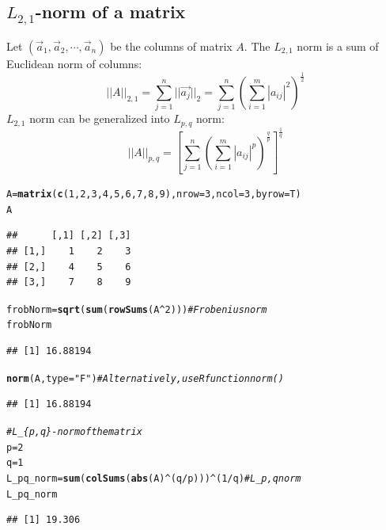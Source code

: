 \documentclass[conference,final,11pt,technote,onecolumn]{IEEEtran}\usepackage[]{graphicx}\usepackage[]{color}
\makeatletter
\newcommand{\hlnum}[1]{\textcolor[rgb]{0.686,0.059,0.569}{#1}}%
\newcommand{\hlstr}[1]{\textcolor[rgb]{0.192,0.494,0.8}{#1}}%
\newcommand{\hlcom}[1]{\textcolor[rgb]{0.678,0.584,0.686}{\textit{#1}}}%
\newcommand{\hlopt}[1]{\textcolor[rgb]{0,0,0}{#1}}%
\newcommand{\hlstd}[1]{\textcolor[rgb]{0.345,0.345,0.345}{#1}}%
\newcommand{\hlkwb}[1]{\textcolor[rgb]{0.69,0.353,0.396}{#1}}%
\newcommand{\hlkwc}[1]{\textcolor[rgb]{0.333,0.667,0.333}{#1}}%
\newcommand{\hlkwd}[1]{\textcolor[rgb]{0.737,0.353,0.396}{\textbf{#1}}}%
\newenvironment{kframe}{%
 \def\at@end@of@kframe{}%
 \ifinner\ifhmode%
  \def\at@end@of@kframe{\end{minipage}}%
  \begin{minipage}{\columnwidth}%
 \fi\fi%
 \def\FrameCommand##1{\hskip\@totalleftmargin \hskip-\fboxsep
 \colorbox{shadecolor}{##1}\hskip-\fboxsep
     \hskip-\linewidth \hskip-\@totalleftmargin \hskip\columnwidth}%
 \MakeFramed {\advance\hsize-\width
   \@totalleftmargin\z@ \linewidth\hsize
   \@setminipage}}%
 {\par\unskip\endMakeFramed%
 \at@end@of@kframe}
\newenvironment{knitrout}{}{} %
\makeatother
\begin{document}
\subsection{$L_{2,1}$-norm of a matrix}
\label{term:l_2,1_norm_of_a_matrix}
Let $(\vec a_1, \vec a_2, \cdots, \vec a_n)$ be the columns of matrix $A$. The $L_{2,1}$ norm\cite{ding2006r} is a sum of Euclidean norm of columns:
\begin{equation}
\nonumber ||A||_{2,1} = \sum_{j=1}^n||\vec{a_j}||_2 = \sum_{j=1}^n\left( \sum_{i=1}^m|a_{ij}|^2\right)^\frac{1}{2}
\end{equation}
$L_{2,1}$ norm can be generalized into $L_{p,q}$ norm:
\begin{equation}
\nonumber ||A||_{p,q} = \left[ \sum_{j=1}^n\left( \sum_{i=1}^m|a_{ij}|^p\right)^\frac{q}{p} \right]^{\frac{1}{q}}
\end{equation}

\begin{knitrout}
\color{fgcolor}\begin{kframe}
\begin{alltt}
\hlstd{A} \hlkwb{=} \hlkwd{matrix}\hlstd{(}\hlkwd{c}\hlstd{(}\hlnum{1}\hlstd{,}\hlnum{2}\hlstd{,}\hlnum{3}\hlstd{,}\hlnum{4}\hlstd{,}\hlnum{5}\hlstd{,}\hlnum{6}\hlstd{,}\hlnum{7}\hlstd{,}\hlnum{8}\hlstd{,}\hlnum{9}\hlstd{),}\hlkwc{nrow}\hlstd{=}\hlnum{3}\hlstd{,}\hlkwc{ncol}\hlstd{=}\hlnum{3}\hlstd{,}\hlkwc{byrow}\hlstd{=T)}
\hlstd{A}
\end{alltt}
\begin{verbatim}
##      [,1] [,2] [,3]
## [1,]    1    2    3
## [2,]    4    5    6
## [3,]    7    8    9
\end{verbatim}
\begin{alltt}
\hlstd{frobNorm} \hlkwb{=} \hlkwd{sqrt}\hlstd{(}\hlkwd{sum}\hlstd{(}\hlkwd{rowSums}\hlstd{(A}\hlopt{^}\hlnum{2}\hlstd{)))} \hlcom{#Frobenius norm}
\hlstd{frobNorm}
\end{alltt}
\begin{verbatim}
## [1] 16.88194
\end{verbatim}
\begin{alltt}
\hlkwd{norm}\hlstd{(A,}\hlkwc{type}\hlstd{=}\hlstr{"F"}\hlstd{)} \hlcom{#Alternatively, use R function norm()}
\end{alltt}
\begin{verbatim}
## [1] 16.88194
\end{verbatim}
\begin{alltt}
\hlcom{#L_\{p,q\}-norm of the matrix}
\hlstd{p} \hlkwb{=} \hlnum{2}
\hlstd{q} \hlkwb{=} \hlnum{1}
\hlstd{L_pq_norm} \hlkwb{=} \hlkwd{sum}\hlstd{(}\hlkwd{colSums}\hlstd{(}\hlkwd{abs}\hlstd{(A)}\hlopt{^}\hlstd{(q}\hlopt{/}\hlstd{p)))}\hlopt{^}\hlstd{(}\hlnum{1}\hlopt{/}\hlstd{q)} \hlcom{#L_p,q norm}
\hlstd{L_pq_norm}
\end{alltt}
\begin{verbatim}
## [1] 19.306
\end{verbatim}
\end{kframe}
\end{knitrout}
\end{document}
